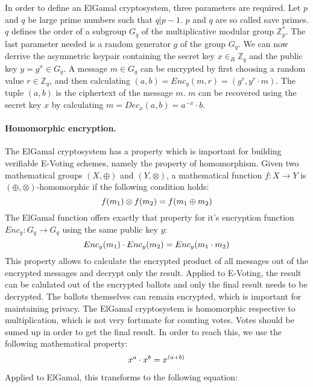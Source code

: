 \documentclass[numbers=noenddot, abstract=on]{scrreprt}
\begin{document}
In order to define an ElGamal cryptosystem, three parameters are required. Let
$p$ and $q$ be large prime numbers such that $q|p-1$. $p$ and $q$ are so
called save primes. $q$ defines the order of a subgroup $G_q$ of the
multiplicative modular group $\mathbb{Z}^*_p$. The last parameter needed is a random generator
$g$ of the group $G_q$. We can now derrive the asymmetric keypair containing the
secret key $x \in_R \mathbb{Z}_q$ and the public key $y=g^x \in G_q$. A message
$m \in G_q$ can be encrypted by first choosing a random value $r \in
\mathbb{Z}_q$, and then calculating $(a, b)=Enc_y(m, r)=(g^r, y^r \cdot m)$. The
tuple $(a, b)$ is the ciphertext of the message $m$. $m$ can be recovered using the secret key $x$
by calculating $m=Dec_x(a, b)=a^{-x} \cdot b$.

\paragraph{Homomorphic encryption.} The ElGamal cryptosystem has a property
which is important for building verifiable E-Voting schemes, namely the property
of homomorphism. Given two mathematical groups $(X,\oplus)$ and $(Y,\otimes)$, a
mathematical function $f:X \rightarrow Y$ is $(\oplus, \otimes)$-homomorphic if
the following condition holds:
\begin{equation}
f(m_1) \otimes f(m_2) = f(m_1 \oplus m_2) \notag
\end{equation}
The ElGamal function offers exactly that property for it's encryption function
$Enc_y:G_q \rightarrow G_q$ using the same public key $y$:
\begin{equation}
Enc_y(m_1) \cdot Enc_y(m_2) = Enc_y(m_1 \cdot m_2) \notag
\end{equation}
This property allows to calculate the encrypted product of all messages out of
the encrypted messages and decrypt only the result. Applied to E-Voting, the
result can be calulated out of the encrypted ballots and only the final result
needs to be decrypted. The ballots themselves can remain encrypted, which is
important for maintaining privacy. The ElGamal cryptosystem is homomorphic
respective to multiplication, which is not very fortunate for counting votes.
Votes should be sumed up in order to get the final result. In order to reach
this, we use the following mathematical property:
\begin{equation}
x^a \cdot x^b = x^{(a+b)} \notag
\end{equation}

Applied to ElGamal, this transforms to the following equation:
\end{document}
